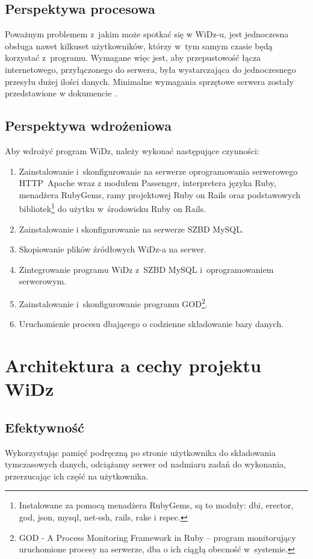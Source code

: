 \documentclass[12pt,leqno,twoside]{mwart}
\begin{document}
\subsection{Perspektywa procesowa}
\noindent Poważnym problemem z~jakim może spotkać się w WiDz-u, jest jednoczesna obsługa nawet kilkuset użytkowników, którzy w~tym samym czasie będą korzystać z~programu. Wymagane więc jest, aby przepustowość łącza internetowego, przyłączonego do serwera, była wystarczająca do jednoczesnego przesyłu dużej ilości danych. Minimalne wymagania sprzętowe serwera zostały przedstawione w dokumencie \cite{WYM}.

\subsection{Perspektywa wdrożeniowa}
\noindent Aby wdrożyć program WiDz, należy wykonać następujące czynności:
\begin{enumerate}
	\item Zainstalowanie i~skonfigurowanie na serwerze oprogramowania serwerowego \hbox{HTTP Apache} wraz z modułem Passenger, interpretera języka Ruby, menadżera RubyGems, ramy projektowej Ruby on Rails oraz podstawowych bibliotek\footnote{Instalowane za pomocą menadżera RubyGems, są to moduły: dbi, erector, god, json, mysql, net-ssh, rails, rake i rspec.} do użytku w~środowisku Ruby on Rails.
	\item Zainstalowanie i skonfigurowanie na serwerze SZBD MySQL.
	\item Skopiowanie plików źródłowych WiDz-a na serwer.
	\item Zintegrowanie programu WiDz z~SZBD MySQL i~oprogramowaniem serwerowym.
	\item Zainstalowanie i~skonfigurowanie programu GOD\footnote{GOD - A Process Monitoring Framework in Ruby -- program monitorujący uruchomione procesy na serwerze, dba o ich ciągłą obecność w~systemie.}.
	\item Uruchomienie procesu dbającego o codzienne składowanie bazy danych.
\end{enumerate}

\section{Architektura a cechy projektu WiDz}
\subsection{Efektywność}
\noindent Wykorzystując pamięć podręczną po stronie użytkownika do składowania tymczasowych danych, odciążamy serwer od nadmiaru zadań do wykonania, przerzucając ich część na użytkownika.
 
\end{document}
